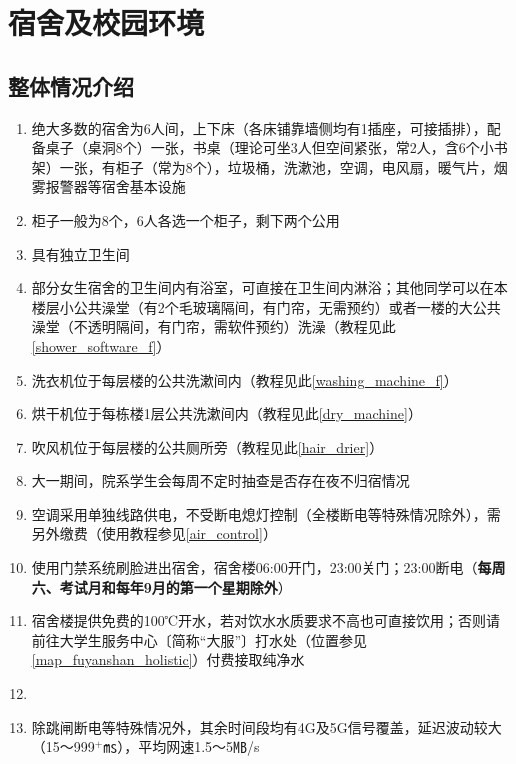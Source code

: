 \section[宿舍及校园环境]{宿舍及校园环境}

\subsection[整体情况介绍]{整体情况介绍}
\begin{enumerate}
    \item 绝大多数的宿舍为6人间，上下床（各床铺靠墙侧均有1插座，可接插排），配备桌子（桌洞8个）一张，书桌（理论可坐3人但空间紧张，常2人，含6个小书架）一张，有柜子（常为8个），垃圾桶，洗漱池，空调，电风扇，暖气片，烟雾报警器等宿舍基本设施
    \item 柜子\footnotemark 一般为8个，6人各选一个柜子，剩下两个公用
    \item 具有独立卫生间
    \item 部分女生宿舍的卫生间内有浴室，可直接在卫生间内淋浴；其他同学可以在本楼层小公共澡堂（有2个毛玻璃隔间，有门帘，无需预约）或者一楼的大公共澡堂（不透明隔间，有门帘，需软件预约）洗澡（教程见此\uline{\ref{shower_software_f}}）
    \item 洗衣机位于每层楼的公共洗漱间内（教程见此\uline{\ref{washing_machine_f}}）
    \item 烘干机位于每栋楼1层公共洗漱间内（教程见此\uline{\ref{dry_machine}}）
    \item 吹风机位于每层楼的公共厕所旁（教程见此\uline{\ref{hair_drier}}）
    \item 大一期间，院系学生会每周不定时抽查是否存在夜不归宿情况
    \item 空调采用单独线路供电，不受断电熄灯控制（全楼断电等特殊情况除外），需另外缴费（使用教程参见\uline{\ref{air_control}}）
    \item 使用门禁系统刷脸进出宿舍，宿舍楼06:00开门，23:00关门；23:00断电（\textbf{每周六、考试月和每年9月的第一个星期除外}）
    \item 宿舍楼提供免费的100℃开水\footnotemark，若对饮水水质要求不高也可直接饮用；否则请前往大学生服务中心〔简称“大服”〕打水处（位置参见\uline{\ref{map_fuyanshan_holistic}}）付费接取纯净水
    \item \textbf{}
    \item 除跳闸断电等特殊情况外，其余时间段均有4G及5G信号覆盖，延迟波动较大（15～999$^+$㎳），平均网速1.5～5㎆/s
\end{enumerate}

